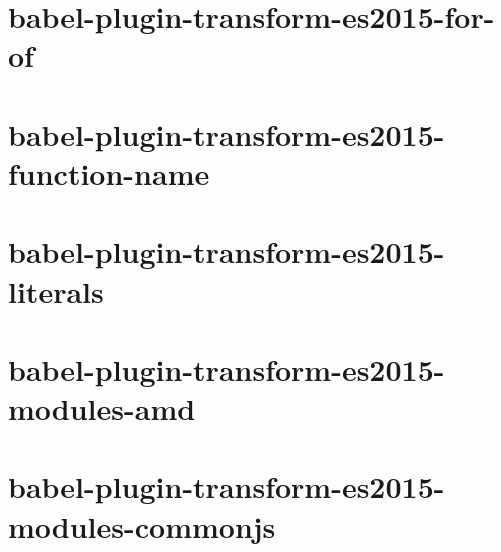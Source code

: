 \documentclass[twoside]{book}
\newcommand{\+}{\discretionary{\mbox{\scriptsize$\hookleftarrow$}}{}{}}
\begin{document}
\chapter{babel-\/plugin-\/transform-\/es2015-\/for-\/of}
\label{md__c_1_workspace_demo_src_main_script_node_modules_babel-plugin-transform-es2015-for-of__r_e_a_d_m_e}

\chapter{babel-\/plugin-\/transform-\/es2015-\/function-\/name}
\label{md__c_1_workspace_demo_src_main_script_node_modules_babel-plugin-transform-es2015-function-name__r_e_a_d_m_e}

\chapter{babel-\/plugin-\/transform-\/es2015-\/literals}
\label{md__c_1_workspace_demo_src_main_script_node_modules_babel-plugin-transform-es2015-literals__r_e_a_d_m_e}

\chapter{babel-\/plugin-\/transform-\/es2015-\/modules-\/amd}
\label{md__c_1_workspace_demo_src_main_script_node_modules_babel-plugin-transform-es2015-modules-amd__r_e_a_d_m_e}

\chapter{babel-\/plugin-\/transform-\/es2015-\/modules-\/commonjs}
\label{md__c_1_workspace_demo_src_main_script_node_modules_babel-plugin-transform-es2015-modules-commonjs__r_e_a_d_m_e}

\end{document}
